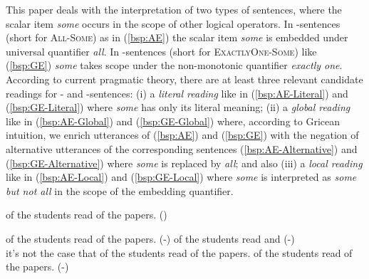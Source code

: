 \documentclass[fleqn,reqno,10pt,draft]{article}
\newcommand{\lit}{\acro{lit}}
\newcommand{\glb}{\acro{glb}}
\newcommand{\loc}{\acro{loc}}
\newcommand{\as}{\acro{as}}
\renewcommand{\es}{\acro{es}}
\begin{document}


This paper deals with the interpretation of two types of sentences,
where the scalar item \emph{some} occurs in the scope of other logical
operators. In \as-sentences (short for \textsc{All-Some}) as in (\ref{bsp:AE})
the scalar item \emph{some} is embedded under universal quantifier
\emph{all}. In \es-sentences (short for \textsc{ExactlyOne-Some}) like (\ref{bsp:GE}) \emph{some} takes
scope under the non-monotonic quantifier \emph{exactly
  one}.
According to current pragmatic theory, there are at least three
relevant candidate readings for \as- and \es-sentences: (i) a
\emph{literal reading} like in (\ref{bsp:AE-Literal}) and
(\ref{bsp:GE-Literal}) where \emph{some} has only its literal meaning;
(ii) a \emph{global reading} like in (\ref{bsp:AE-Global}) and
(\ref{bsp:GE-Global}) where, according to Gricean intuition, we enrich
utterances of (\ref{bsp:AE}) and (\ref{bsp:GE}) with the negation of
alternative utterances of the corresponding sentences
(\ref{bsp:AE-Alternative}) and (\ref{bsp:GE-Alternative}) where
\emph{some} is replaced by \emph{all}; and also (iii) a \emph{local
  reading} like in (\ref{bsp:AE-Local}) and (\ref{bsp:GE-Local}) where
\emph{some} is interpreted as \emph{some but not all} in the scope of
the embedding quantifier.


\begin{exe}
  \ex \label{bsp:AE}  of the students read {} of the
  papers. \hfill{(\as)}

  \begin{xlist}
  \ex \label{bsp:AE-Literal}  of the students read
    {} of the papers. \hfill (\as-\lit)
  \ex \label{bsp:AE-Global}
     of the students read  
    and  \hfill (\as-\glb)\\
    it's not the case that  of the students read  of the papers.
  \ex \label{bsp:AE-Local}
     of the students read {} of the
    papers. \hfill (\as-\loc)
  \end{xlist}
\end{exe}
\end{document}
